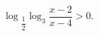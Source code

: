 \begin{ex}[type=inequality]
	\begin{condition}
		$\log$\tiny$_{\dfrac{1}{2}}$\normalsize$\log_3\dfrac{x - 2}{x - 4}>0  .$
	\end{condition}
\end{ex}